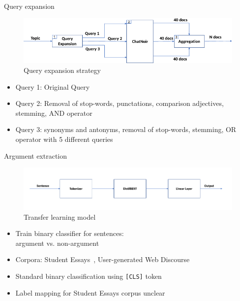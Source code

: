 \documentclass[english]{mlutalk}
\begin{document}
\begin{frame}[allowframebreaks]{Query expansion}
  \begin{figure}
    \centering
    \includegraphics[width=0.8\linewidth]{figures/distilbert-based-arg-retrieval-query-expansion.pdf}
    \caption{Query expansion strategy~\cite{AlhamzehBEM2021}}
    \label{query-expansion}
  \end{figure}

  \begin{itemize}
    \item Query 1: Original Query
    \item Query 2: Removal of stop-words, punctations, comparison adjectives, stemming, AND operator
    \item Query 3: synonyms and antonyms, removal of stop-words, stemming, OR operator with 5 different queries
  \end{itemize}
\end{frame}

\begin{frame}{Argument extraction~\cite{AlhamzehBEM2021}}
  \begin{figure}
    \centering
    \includegraphics[width=0.7\linewidth]{figures/distilbert-based-arg-retrieval-processing.pdf}
    \caption{Transfer learning model~\cite{AlhamzehBEM2021}}
    \label{model}
  \end{figure}

  \begin{itemize}
    \item Train binary classifier for sentences: \\ argument vs. non-argument
    \item Corpora: Student Essays~\cite{HabernalG2017}, User-generated Web Discourse~\cite{StabG2014}
    \item Standard binary classification using \texttt{[CLS]} token
    \item Label mapping for Student Essays corpus unclear
  \end{itemize}
\end{frame}
\end{document}
